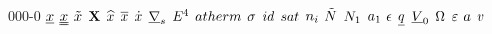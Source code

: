 \begin{mitframe}{000-0}
$\exvecone$ \newline
$\exvectwo$ \newline
$\exvecthree$ \newline
$\matrx$ \newline
$\intscal$ \newline
$\partmol$ \newline
$\tderiv$ \newline
$\surfgradop$ \newline
$\axbiop$ \newline
$\atfunc$ \newline
$\bound$ \newline
$\idgas$ \newline
$\satvap$ \newline
$\molspecies{i}$ \newline
$\totmoles$ \newline
$\molesi{1}$ \newline
$\activityi{1}$ \newline
$\welldepth$ \newline
$\eleccharge$ \newline
$\origvol$ \newline
$\linstrain$ \newline
$\partpoten$ \newline
$\sphcorerad$ \newline
$\waven$ \newline


\end{mitframe}
